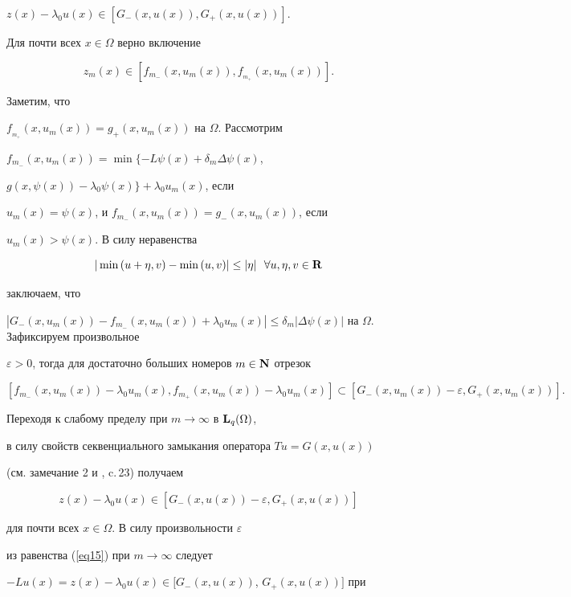 $z(x)-\lambda_0u(x)\in[G_{-}(x,u(x)),G_{+}(x,u(x))]$.


Для почти всех $x\in\Omega$ верно включение


$$


z_m(x)\in [f_{m_-}(x,u_m(x)),f_{_{m_+}}(x,u_m(x))].  %


$$


Заметим, что


$f_{_{m_+}}(x,u_m(x))=g_+(x,u_m(x))$ на $\Omega$. Рассмотрим


$f_{m_-}(x,u_m(x))=\min\{-L\psi(x)+\delta_m\Delta\psi(x)$,


$g(x,\psi(x))-\lambda_0\psi(x)\}+\lambda_0 u_m(x)$, если


$u_m(x)=\psi(x)$, и $f_{m_-}(x,u_m(x))=g_-(x,u_m(x))$, если


$u_m(x)>\psi(x)$. В силу неравенства


$$


|\min{(u+\eta,v)}-\min{(u,v)}|\le|\eta|\ \ \forall u,\eta,v\in \bold R


$$


заключаем, что 


$|G_-(x,u_m(x))-f_{m_-}(x,u_m(x))+\lambda_0u_m(x)|


\le\delta_m|\Delta\psi(x)|$ на $\Omega$. Зафиксируем произвольное


$\varepsilon>0$, тогда для достаточно больших номеров $m\in {\bold


N}$ отрезок


$$


[f_{m_-}(x,u_m(x))-\lambda_0u_m(x),f_{m_+}(x,u_m(x))-


\lambda_0u_m(x)]\subset[G_-(x,u_m(x))-\varepsilon,G_+(x,u_m(x))].


$$


Переходя к слабому пределу при $m\to\infty$ в ${\bold L}_q(\Omega)$,


в силу  свойств секвенциального замыкания оператора $Tu=G(x,u(x))$


(см. замечание 2 и \cite{Pav7}, c.\,23) получаем


$$


z(x)-\lambda_0u(x)\in[G_{-}(x,u(x))-\varepsilon,G_{+}(x,u(x))]


$$


для почти всех $x\in\Omega$. В силу произвольности $\varepsilon$


из равенства (\ref{eq15}) при $m\to\infty$ следует


$-Lu(x)=z(x)-\lambda_0u(x)\in[G_{-}(x,u(x))$, $G_{+}(x,u(x))]$ при



